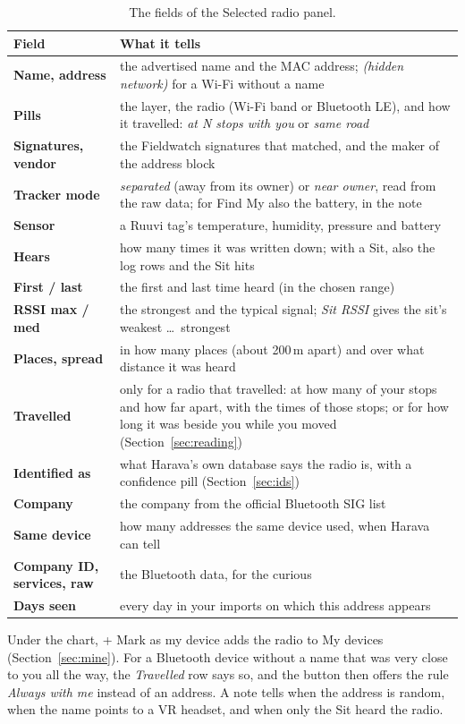 \documentclass[10pt,a4paper]{article}
\newcommand{\ui}[1]{\textsf{\small #1}}            %
\begin{document}
\begin{table}[H]\small\centering
\begin{tabularx}{\textwidth}{>{\bfseries}p{2.7cm}X}
\toprule
Field & What it tells\\
\midrule
Name, address & the advertised name and the MAC address; \emph{(hidden network)} for a Wi-Fi without a name\\
Pills & the layer, the radio (Wi-Fi band or Bluetooth LE), and how it travelled: \emph{at N stops with you} or \emph{same road}\\
Signatures, vendor & the Fieldwatch signatures that matched, and the maker of the address block\\
Tracker mode & \emph{separated} (away from its owner) or \emph{near owner}, read from the raw data; for Find My also the battery, in the note\\
Sensor & a Ruuvi tag's temperature, humidity, pressure and battery\\
Hears & how many times it was written down; with a Sit, also the log rows and the Sit hits\\
First / last & the first and last time heard (in the chosen range)\\
RSSI max / med & the strongest and the typical signal; \emph{Sit RSSI} gives the sit's weakest \dots\ strongest\\
Places, spread & in how many places (about 200\,m apart) and over what distance it was heard\\
Travelled & only for a radio that travelled: at how many of your stops and how far apart, with the times of those stops; or for how long it was beside you while you moved (Section~\ref{sec:reading})\\
Identified as & what Harava's own database says the radio is, with a confidence pill (Section~\ref{sec:ids})\\
Company & the company from the official Bluetooth SIG list\\
Same device & how many addresses the same device used, when Harava can tell\\
Company ID, services, raw & the Bluetooth data, for the curious\\
Days seen & every day in your imports on which this address appears\\
\bottomrule
\end{tabularx}
\caption{The fields of the Selected radio panel.}
\end{table}

Under the chart, \ui{+ Mark as my device} adds the radio to My devices (Section~\ref{sec:mine}). For a Bluetooth device without a name that was very close to you all the way, the \emph{Travelled} row says so, and the button then offers the rule \emph{Always with me} instead of an address. A note tells when the address is random, when the name points to a VR headset, and when only the Sit heard the radio.
\end{document}
